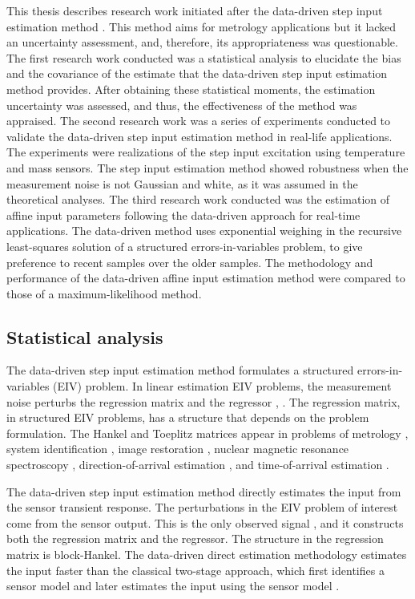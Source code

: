 This thesis describes research work initiated after the data-driven step input estimation method \citep{Markovsky15cep}.
This method aims for metrology applications but it lacked an uncertainty assessment, and, therefore, its appropriateness was questionable.
The first research work conducted was a statistical analysis to elucidate the bias and the covariance of the estimate that the data-driven step input estimation method provides.
After obtaining these statistical moments, the estimation uncertainty was assessed, and thus, the effectiveness of the method was appraised.
The second research work was a series of experiments conducted to validate the data-driven step input estimation method in real-life applications.
The experiments were realizations of the step input excitation using temperature and mass sensors.
The step input estimation method showed robustness when the measurement noise is not Gaussian and white, as it was assumed in the theoretical analyses.
The third research work conducted was the estimation of affine input parameters following the data-driven approach for real-time applications. 
The data-driven method uses exponential weighing in the recursive least-squares solution of a structured errors-in-variables problem, to give preference to recent samples over the older samples.
The methodology and performance of the data-driven affine input estimation method were compared to those of a maximum-likelihood method.

\subsection{Statistical analysis}

The data-driven step input estimation method formulates a structured errors-in-variables (EIV) problem.
In linear estimation EIV problems, the measurement noise perturbs the regression matrix and the regressor \citep{VanHuffel91Book}, \citep{Markovsky07overview}.
The regression matrix, in structured EIV problems, has a structure that depends on the problem formulation.
The Hankel and Toeplitz matrices appear in problems of metrology \citep{Markovsky15cep}, system identification \citep{Soderstrom07}, image restoration \citep{Feiz17}, nuclear magnetic resonance spectroscopy \citep{Cai16}, direction-of-arrival estimation \citep{Pan18}, and time-of-arrival estimation \citep{Jia18}.

The data-driven step input estimation method directly estimates the input from the sensor transient response. 
The perturbations in the EIV problem of interest come from the sensor output.
This is the only observed signal \citep{Markovsky15cep}, and it constructs both the regression matrix and the regressor.
The structure in the regression matrix is block-Hankel.
The data-driven direct estimation methodology  estimates the input faster than the classical two-stage approach, which first identifies a sensor model and later estimates the input using the sensor model \citep{Azam15, Niedzwiecki16a}.


